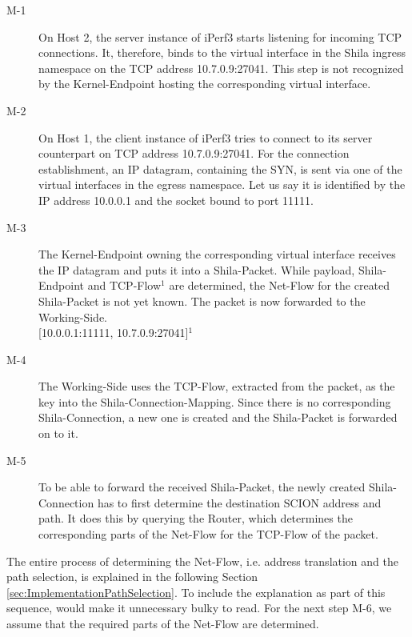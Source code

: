 \begin{description}
	\item[M-1] On Host 2, the server instance of iPerf3 starts listening for incoming TCP connections. It, therefore, binds to the virtual interface in the Shila ingress namespace on the TCP address {\footnotesize 10.7.0.9:27041}. This step is not recognized by the Kernel-Endpoint hosting the corresponding virtual interface.
	\item[M-2] On Host 1, the client instance of iPerf3 tries to connect to its server counterpart on TCP address {\footnotesize 10.7.0.9:27041}. For the connection establishment, an IP datagram, containing the SYN, is sent via one of the virtual interfaces in the egress namespace. Let us say it is identified by the IP address {\footnotesize 10.0.0.1} and the socket bound to port {\footnotesize 11111}.
	\item[M-3] The Kernel-Endpoint owning the corresponding virtual interface receives the IP datagram and puts it into a Shila-Packet. While payload, Shila-Endpoint and TCP-Flow$^{1}$ are determined, the Net-Flow for the created Shila-Packet is not yet known. The packet is now forwarded to the Working-Side.\medskip\\{\footnotesize[10.0.0.1:11111, 10.7.0.9:27041]$^{1}$}
	\item[M-4] The Working-Side uses the TCP-Flow, extracted from the packet, as the key into the Shila-Connection-Mapping. Since there is no corresponding Shila-Connection, a new one is created and the Shila-Packet is forwarded on to it.  
	\item[M-5] To be able to forward the received Shila-Packet, the newly created Shila-Connection has to first determine the destination SCION address and path. It does this by querying the Router, which determines the corresponding parts of the Net-Flow for the TCP-Flow of the packet.
\end{description}

The entire process of determining the Net-Flow, i.e. address translation and the path selection, is explained in the following Section \ref{sec:ImplementationPathSelection}. To include the explanation as part of this sequence, would make it unnecessary bulky to read. For the next step M-6, we assume that the required parts of the Net-Flow are determined.

